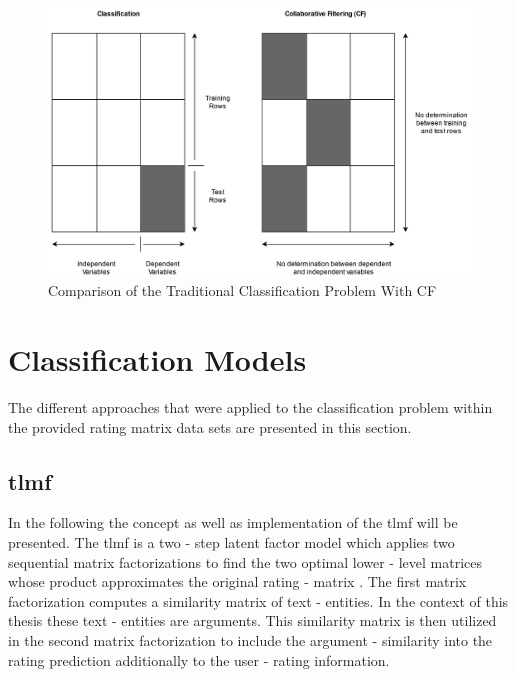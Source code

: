 \begin{figure}[t]
    \centering
    \includegraphics[width=1\textwidth]{images/CFvsClassification2.jpg}
    \caption{Comparison of the Traditional Classification Problem With CF \cite{aggarwal2016recommender}}
    \label{fig:CFvsClassification}
\end{figure}

\section{Classification Models}
\label{sec:models}
The different approaches that were applied to the classification problem within the provided rating matrix data sets are presented in this section. 

\subsection{\acrfull{tlmf}}
In the following the concept as well as implementation of the \acrshort{tlmf} will be presented.
The \acrshort{tlmf} is a two - step latent factor model which applies two sequential matrix factorizations 
to find the two optimal lower - level matrices whose product approximates the original rating - matrix \cite{li2016two}.
The first matrix factorization computes a similarity matrix of text - entities.
In the context of this thesis these text - entities are arguments. This similarity matrix is then utilized in the second
matrix factorization to include the argument - similarity into the rating prediction additionally to the user - rating information.

